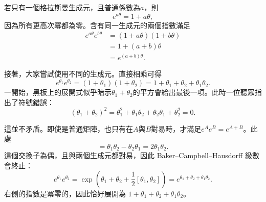 若只有一個格拉斯曼生成元，且普通係數為\(a\)，則
\begin{equation}
e^{a\theta}
=1+a\theta,
\end{equation}
因為所有更高次冪都為零。含有同一生成元的兩個指數滿足
\begin{align}
e^{a\theta}e^{b\theta}
&=(1+a\theta)(1+b\theta)\\
&=1+(a+b)\theta\\
&=e^{(a+b)\theta}.
\end{align}

接著，大家嘗試使用不同的生成元。直接相乘可得
\begin{equation}
e^{\theta_1}e^{\theta_2}
=(1+\theta_1)(1+\theta_2)
=1+\theta_1+\theta_2+\theta_1\theta_2.
\end{equation}
一開始，黑板上的展開式似乎暗示\(\theta_1+\theta_2\)的平方會給出最後一項。此時一位聽眾指出了符號錯誤：
\begin{equation}
(\theta_1+\theta_2)^2
=\theta_1^2+\theta_1\theta_2
 +\theta_2\theta_1+\theta_2^2
=0.
\end{equation}

\begin{classroomqa}
\end{classroomqa}

這並不矛盾。即使是普通矩陣，也只有在\(A\)與\(B\)對易時，才滿足\(e^Ae^B=e^{A+B}\)。此處
\begin{equation}
[\theta_1,\theta_2]
=\theta_1\theta_2-\theta_2\theta_1
=2\theta_1\theta_2.
\end{equation}
這個交換子為偶，且與兩個生成元都對易，因此 Baker–Campbell–Hausdorff 級數會終止：
\begin{equation}
e^{\theta_1}e^{\theta_2}
=\exp\left(
\theta_1+\theta_2+\frac12[\theta_1,\theta_2]
\right)
=e^{\theta_1+\theta_2+\theta_1\theta_2}.
\end{equation}
右側的指數是冪零的，因此恰好展開為
\(1+\theta_1+\theta_2+\theta_1\theta_2\)。

\begin{classroomqa}
\end{classroomqa}

